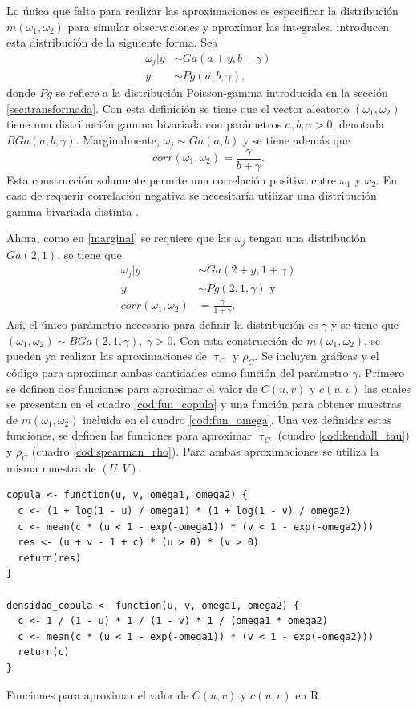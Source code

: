 \documentclass[11pt,a4paper]{article}
\begin{document}
Lo único que falta para realizar las aproximaciones es especificar la distribución $m(\omega_1, \omega_2)$ para simular observaciones y aproximar las integrales. \citet{nieto} introducen esta distribución de la siguiente forma. Sea
\begin{align*}
\omega_j | y &\sim Ga(a + y, b + \gamma)\\
y &\sim Pg(a, b, \gamma),
\end{align*}
donde $Pg$ se refiere a la distribución Poisson-gamma introducida en la sección \ref{sec:transformada}. Con esta definición se tiene que el vector aleatorio $(\omega_1, \omega_2)$ tiene una distribución gamma bivariada con parámetros $a, b, \gamma > 0$, denotada $BGa(a, b, \gamma)$. Marginalmente, $\omega_j \sim Ga(a, b)$ y se tiene además que $$corr(\omega_1, \omega_2) = \frac{\gamma}{b + \gamma}.$$ Esta construcción solamente permite una correlación positiva entre $\omega_1$ y $\omega_2$. En caso de requerir correlación negativa se necesitaría utilizar una distribución gamma bivariada distinta \citep{nieto}.

Ahora, como en \eqref{marginal} se requiere que las $\omega_j$ tengan una distribución $Ga(2, 1)$, se tiene que 
\begin{align} \label{eq_omegas}
\omega_j | y &\sim Ga(2 + y, 1 + \gamma) \nonumber\\
y &\sim Pg(2, 1, \gamma) \text{ y} \\
corr(\omega_1, \omega_2) &= \frac{\gamma}{1 + \gamma}. \nonumber
\end{align}
Así, el único parámetro necesario para definir la distribución es $\gamma$ y se tiene que $(\omega_1, \omega_2) \sim BGa(2, 1, \gamma), \ \gamma >0$. Con esta construcción de $m(\omega_1, \omega_2)$, se pueden ya realizar las aproximaciones de $\uptau_C$ y $\rho_C$. Se incluyen gráficas y el código para aproximar ambas cantidades como función del parámetro $\gamma$. Primero se definen dos funciones para aproximar el valor de $C(u, v)$ y $c(u, v)$ las cuales se presentan en el cuadro \ref{cod:fun_copula} y una función para obtener muestras de $m(\omega_1, \omega_2)$ incluida en el cuadro \ref{cod:fun_omega}. Una vez definidas estas funciones, se definen las funciones para aproximar $\uptau_C$ (cuadro \ref{cod:kendall_tau}) y $\rho_C$ (cuadro \ref{cod:spearman_rho}). Para ambas aproximaciones se utiliza la misma muestra de $(U, V)$.

\begin{table}[!htb]
\begin{lstlisting}
copula <- function(u, v, omega1, omega2) {
  c <- (1 + log(1 - u) / omega1) * (1 + log(1 - v) / omega2)
  c <- mean(c * (u < 1 - exp(-omega1)) * (v < 1 - exp(-omega2)))
  res <- (u + v - 1 + c) * (u > 0) * (v > 0)
  return(res)
}

densidad_copula <- function(u, v, omega1, omega2) {
  c <- 1 / (1 - u) * 1 / (1 - v) * 1 / (omega1 * omega2)
  c <- mean(c * (u < 1 - exp(-omega1)) * (v < 1 - exp(-omega2)))
  return(c)
}
\end{lstlisting}
\caption{Funciones para aproximar el valor de $C(u, v)$ y $c(u, v)$ en R.}
\label{cod:fun_copula}
\end{table}
\end{document}
